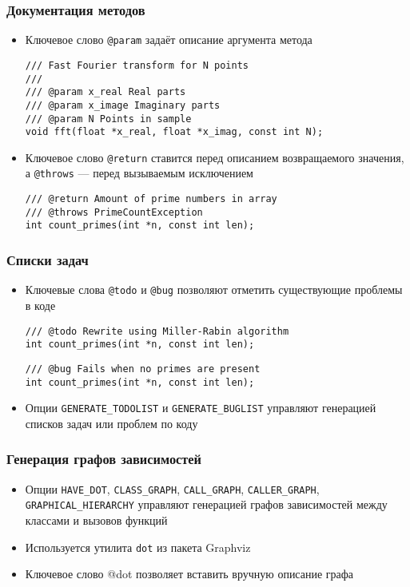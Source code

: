 \documentclass[onlymath]{beamer}
\begin{document}
\begin{frame}[fragile]
  \frametitle{Документация методов}
  \begin{itemize}
  \item Ключевое слово \texttt{@param} задаёт описание аргумента метода
    \begin{lstlisting}
/// Fast Fourier transform for N points
///
/// @param x_real Real parts
/// @param x_image Imaginary parts
/// @param N Points in sample
void fft(float *x_real, float *x_imag, const int N);
    \end{lstlisting}
  \item Ключевое слово \texttt{@return} ставится перед описанием
    возвращаемого значения, а \texttt{@throws} — перед вызываемым
    исключением
\begin{lstlisting}
/// @return Amount of prime numbers in array
/// @throws PrimeCountException
int count_primes(int *n, const int len);
\end{lstlisting}
  \end{itemize}
\end{frame}

\begin{frame}[fragile]
  \frametitle{Списки задач}
  \begin{itemize}
  \item Ключевые слова \texttt{@todo} и \texttt{@bug} позволяют
    отметить существующие проблемы в коде
\begin{lstlisting}
/// @todo Rewrite using Miller-Rabin algorithm
int count_primes(int *n, const int len);
\end{lstlisting}
\begin{lstlisting}
/// @bug Fails when no primes are present
int count_primes(int *n, const int len);
\end{lstlisting}
  \item Опции \texttt{GENERATE\_TODOLIST} и \texttt{GENERATE\_BUGLIST}
    управляют генерацией списков задач или проблем по коду
  \end{itemize}
\end{frame}

\begin{frame}
  \frametitle{Генерация графов зависимостей}
  \begin{itemize}
  \item Опции \texttt{HAVE\_DOT}, \texttt{CLASS\_GRAPH},
    \texttt{CALL\_GRAPH}, \texttt{CALLER\_GRAPH},
    \texttt{GRAPHICAL\_HIERARCHY} управляют генерацией графов
    зависимостей между классами и вызовов функций
  \item Используется утилита \texttt{dot} из пакета Graphviz
  \item Ключевое слово @dot позволяет вставить вручную описание графа
  \end{itemize}
\end{frame}
\end{document}
